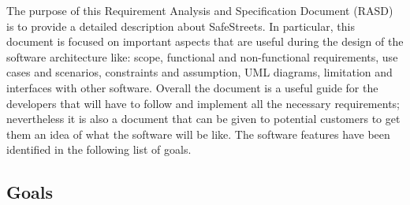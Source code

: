 The purpose of this Requirement Analysis and Specification Document (RASD)
is to provide a detailed description about SafeStreets.
In particular, this document is focused on important aspects that are
useful during the design of the software architecture like: scope, functional and
non-functional requirements, use cases and scenarios, constraints and assumption, UML diagrams, limitation and interfaces with other software.
Overall the document is a useful guide for the developers that will have to follow
and implement all the necessary requirements; nevertheless it is also a document
that can be given to potential customers to get them an idea of what the software
will be like.\newline
The software features have been identified in the following list of goals.

\subsection{Goals}

